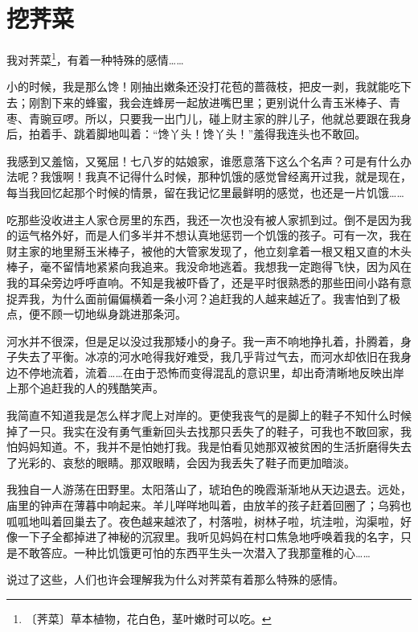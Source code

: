 \documentclass[12pt,UTF-8,openany]{ctexbook}
\begin{document}
\chapter{挖荠菜}

\begin{normalsize}
    
    我对荠菜\footnote{〔荠菜〕草本植物，花白色，茎叶嫩时可以吃。}，有着一种特殊的感情……
    
    小的时候，我是那么馋！刚抽出嫩条还没打花苞的蔷薇枝，把皮一剥，我就能吃下去；刚割下来的蜂蜜，我会连蜂房一起放进嘴巴里；更别说什么青玉米棒子、青枣、青豌豆啰。所以，只要我一出门儿，碰上财主家的胖儿子，他就总要跟在我身后，拍着手、跳着脚地叫着：“馋丫头！馋丫头！”羞得我连头也不敢回。
    
    我感到又羞恼，又冤屈！七八岁的姑娘家，谁愿意落下这么个名声？可是有什么办法呢？我饿啊！我真不记得什么时候，那种饥饿的感觉曾经离开过我，就是现在，每当我回忆起那个时候的情景，留在我记忆里最鲜明的感觉，也还是一片饥饿……
    
    吃那些没收进主人家仓房里的东西，我还一次也没有被人家抓到过。倒不是因为我的运气格外好，而是人们多半并不想认真地惩罚一个饥饿的孩子。可有一次，我在财主家的地里掰玉米棒子，被他的大管家发现了，他立刻拿着一根又粗又直的木头棒子，毫不留情地紧紧向我追来。我没命地逃着。我想我一定跑得飞快，因为风在我的耳朵旁边呼呼直响。不知是我被吓昏了，还是平时很熟悉的那些田间小路有意捉弄我，为什么面前偏偏横着一条小河？追赶我的人越来越近了。我害怕到了极点，便不顾一切地纵身跳进那条河。
    
    河水并不很深，但是足以没过我那矮小的身子。我一声不响地挣扎着，扑腾着，身子失去了平衡。冰凉的河水呛得我好难受，我几乎背过气去，而河水却依旧在我身边不停地流着，流着……在由于恐怖而变得混乱的意识里，却出奇清晰地反映出岸上那个追赶我的人的残酷笑声。
    
    我简直不知道我是怎么样才爬上对岸的。更使我丧气的是脚上的鞋子不知什么时候掉了一只。我实在没有勇气重新回头去找那只丢失了的鞋子，可我也不敢回家，我怕妈妈知道。不，我并不是怕她打我。我是怕看见她那双被贫困的生活折磨得失去了光彩的、哀愁的眼睛。那双眼睛，会因为我丢失了鞋子而更加暗淡。
    
    我独自一人游荡在田野里。太阳落山了，琥珀色的晚霞渐渐地从天边退去。远处，庙里的钟声在薄暮中响起来。羊儿咩咩地叫着，由放羊的孩子赶着回圈了；乌鸦也呱呱地叫着回巢去了。夜色越来越浓了，村落啦，树林子啦，坑洼啦，沟渠啦，好像一下子全都掉进了神秘的沉寂里。我听见妈妈在村口焦急地呼唤着我的名字，只是不敢答应。一种比饥饿更可怕的东西平生头一次潜入了我那童稚的心……
    
    说过了这些，人们也许会理解我为什么对荠菜有着那么特殊的感情。
    

\end{normalsize}
\end{document}
